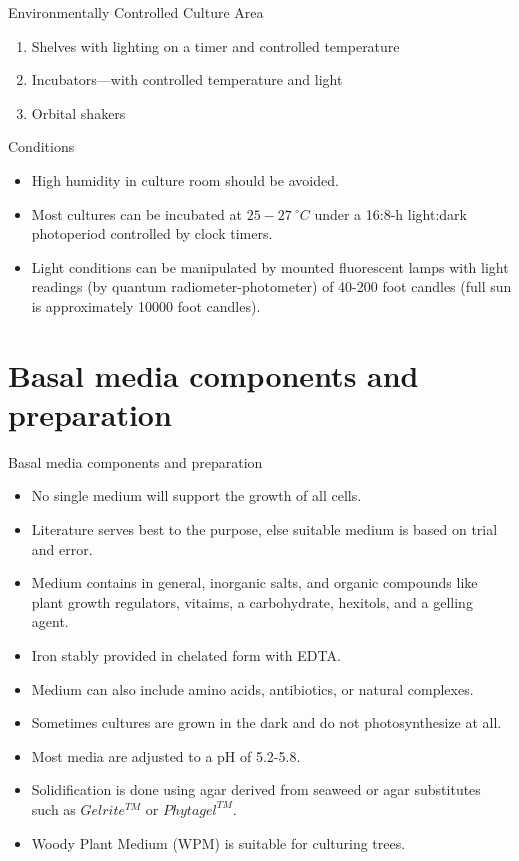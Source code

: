 \documentclass[
  ignorenonframetext,
  aspectratio=169]{beamer}
\providecommand{\tightlist}{%
  \setlength{\itemsep}{0pt}\setlength{\parskip}{0pt}}
\begin{document}
\begin{frame}{Environmentally Controlled Culture Area}
\protect\hypertarget{environmentally-controlled-culture-area}{}
\begin{enumerate}
\tightlist
\item
  Shelves with lighting on a timer and controlled temperature
\item
  Incubators---with controlled temperature and light
\item
  Orbital shakers
\end{enumerate}
\end{frame}

\begin{frame}{Conditions}
\protect\hypertarget{conditions}{}
\begin{itemize}
\tightlist
\item
  High humidity in culture room should be avoided.
\item
  Most cultures can be incubated at \(25-27~^\circ C\) under a 16:8-h
  light:dark photoperiod controlled by clock timers.
\item
  Light conditions can be manipulated by mounted fluorescent lamps with
  light readings (by quantum radiometer-photometer) of 40-200 foot
  candles (full sun is approximately 10000 foot candles).
\end{itemize}
\end{frame}

\hypertarget{basal-media-components-and-preparation}{%
\section{Basal media components and
preparation}\label{basal-media-components-and-preparation}}

\begin{frame}{Basal media components and preparation}
\begin{itemize}
\tightlist
\item
  No single medium will support the growth of all cells.
\item
  Literature serves best to the purpose, else suitable medium is based
  on trial and error.
\item
  Medium contains in general, inorganic salts, and organic compounds
  like plant growth regulators, vitaims, a carbohydrate, hexitols, and a
  gelling agent.
\item
  Iron stably provided in chelated form with EDTA.
\item
  Medium can also include amino acids, antibiotics, or natural
  complexes.
\item
  Sometimes cultures are grown in the dark and do not photosynthesize at
  all.
\item
  Most media are adjusted to a pH of 5.2-5.8.
\item
  Solidification is done using agar derived from seaweed or agar
  substitutes such as \(Gelrite^{TM}\) or \(Phytagel^{TM}\).
\item
  Woody Plant Medium (WPM) is suitable for culturing trees.
\end{itemize}
\end{frame}
\end{document}
